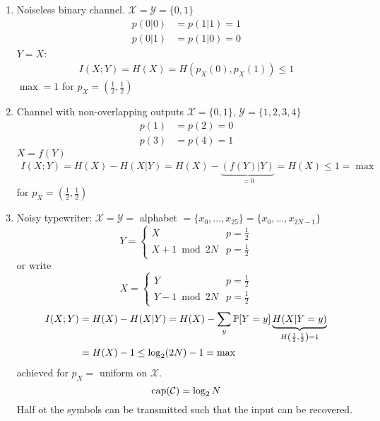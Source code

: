 \documentclass[mfit.tex]{subfiles}
\begin{document}
\begin{exs}
  \begin{enumerate}
    \item Noiseless binary channel. $\mathcal{X} = \mathcal{Y} = \{0,1\}$
    \begin{align*}
      p(0|0) &= p(1|1) = 1 \\
      p(0|1) &= p(1|0) = 0
    \end{align*}
    $Y = X$: 
    \begin{align*}
      I(X;Y) = H(X) = H(p_X(0),p_X(1)) \leq 1
    \end{align*}
    $\max = 1$ for $p_X = \left( \frac{1}{2},\frac{1}{2} \right)$
    \item Channel with non-overlapping outputs $\mathcal{X} = \{0,1\}$, $\mathcal{Y} = \{1,2,3,4\}$
    \begin{align*}
      p(1) &= p(2) = 0 \\
      p(3) &= p(4) = 1
    \end{align*}
    $X = f(Y)$
    \begin{align*}
      I(X;Y) = H(X) - H(X|Y) = H(X) - \underbrace{(f(Y)|Y)}_{=0} = H(X) \leq 1 = \max
    \end{align*}
    for $p_X = \left( \frac{1}{2},\frac{1}{2} \right)$
    \item Noisy typewriter: $\mathcal{X} = \mathcal{Y} =$ alphabet $= \{x_0,\dots,x_{25}\} = \{x_0,\dots,x_{2N-1}\}$
    \[ Y = \begin{cases} X & p = \frac{1}{2} \\ X+1 \bmod 2N & p = \frac{1}{2} \end{cases} \]
    or write
    \[ X = \begin{cases} Y & p= \frac{1}{2} \\ Y - 1 \bmod 2N & p = \frac{1}{2} \end{cases} \]
    \begin{align*}
      I(X;Y) &= H(X) - H(X|Y) = H(X) - \sum_y \operatorname{\mathbb{P}}[Y=y] \underbrace{H(X|Y=y)}_{H\left(\frac{1}{2},\frac{1}{2}\right) = 1} \\
      &= H(X) -1 \leq \log_2(2N) - 1 = \max
    \end{align*}
    achieved for $p_X = $ uniform on $\mathcal{X}$.
    \[ \operatorname{cap}(\mathcal{C}) = \log_2 N \]
    Half ot the symbols can be transmitted such that the input can be recovered.
  \end{enumerate}
\end{exs}
\end{document}
